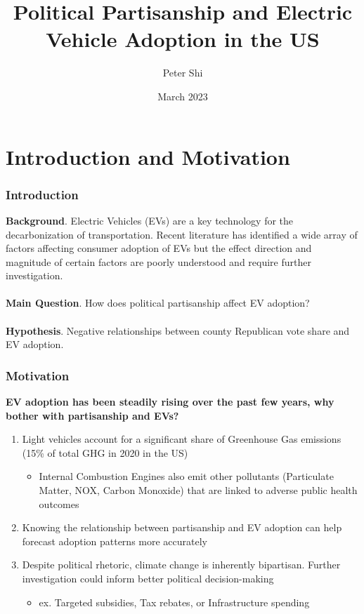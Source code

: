\documentclass{beamer}
\title[Political Partisanship and EVs]
{Political Partisanship and Electric Vehicle Adoption in the US}
\author[Peter Shi] %
{Peter Shi}
\date[March 2023] %
{March 2023}
\begin{document}
\frame{\titlepage}

\section{Introduction and Motivation}

\begin{frame}
\frametitle{Introduction}
    \textbf{Background}. Electric Vehicles (EVs) are a key technology for the decarbonization of transportation. Recent literature has identified a wide array of factors affecting consumer adoption of EVs but the effect direction and magnitude of certain factors are poorly understood and require further investigation. \\~\\
    
    \textbf{Main Question}. How does political partisanship affect EV adoption? \\~\\
    
    \textbf{Hypothesis}. Negative relationships between county Republican vote share and EV adoption.

\end{frame}

\begin{frame}
\frametitle{Motivation}
    
\textbf{EV adoption has been steadily rising over the past few years, why bother with partisanship and EVs?}
\begin{enumerate}
\item Light vehicles account for a significant share of Greenhouse Gas emissions (15\% of total GHG in 2020 in the US)
    \begin{itemize}
        \item Internal Combustion Engines also emit other pollutants (Particulate Matter, NOX, Carbon Monoxide) that are linked to adverse public health outcomes
    \end{itemize}
\item Knowing the relationship between partisanship and EV adoption can help forecast adoption patterns more accurately
\item Despite political rhetoric, climate change is inherently bipartisan. Further investigation could inform better political decision-making 
    \begin{itemize}
        \item ex. Targeted subsidies, Tax rebates, or Infrastructure spending
    \end{itemize}
\end{enumerate}
\end{frame}
\end{document}
